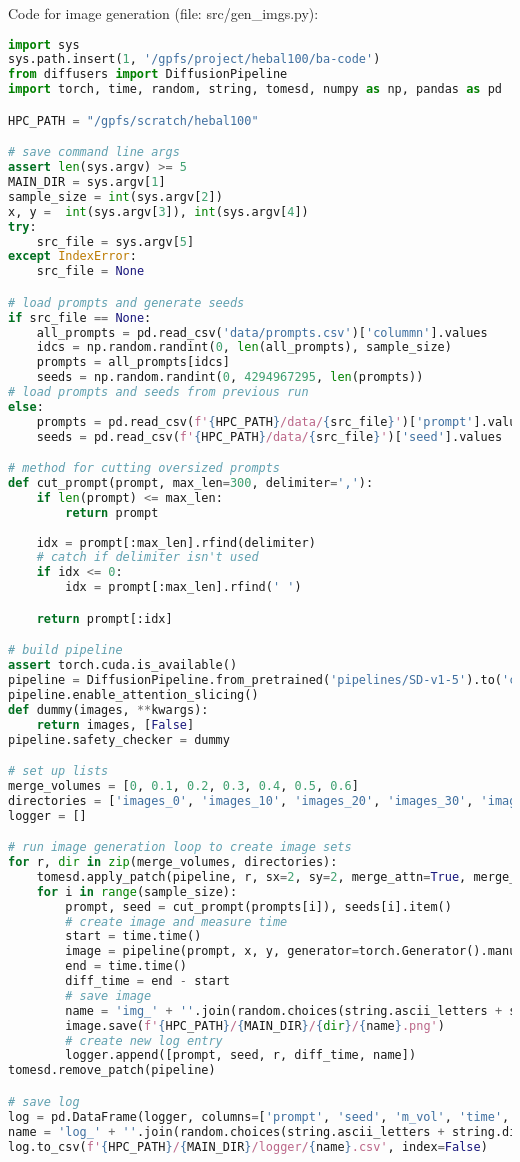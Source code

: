 Code for image generation (file: src/gen\_imgs.py):
\begin{lstlisting}[language=Python]
import sys       
sys.path.insert(1, '/gpfs/project/hebal100/ba-code')
from diffusers import DiffusionPipeline
import torch, time, random, string, tomesd, numpy as np, pandas as pd

HPC_PATH = "/gpfs/scratch/hebal100"

# save command line args
assert len(sys.argv) >= 5
MAIN_DIR = sys.argv[1]                      
sample_size = int(sys.argv[2])            
x, y =  int(sys.argv[3]), int(sys.argv[4]) 
try:
    src_file = sys.argv[5]                
except IndexError:
    src_file = None          

# load prompts and generate seeds
if src_file == None:
    all_prompts = pd.read_csv('data/prompts.csv')['colummn'].values
    idcs = np.random.randint(0, len(all_prompts), sample_size)
    prompts = all_prompts[idcs]
    seeds = np.random.randint(0, 4294967295, len(prompts))
# load prompts and seeds from previous run
else:
    prompts = pd.read_csv(f'{HPC_PATH}/data/{src_file}')['prompt'].values
    seeds = pd.read_csv(f'{HPC_PATH}/data/{src_file}')['seed'].values

# method for cutting oversized prompts
def cut_prompt(prompt, max_len=300, delimiter=','):
    if len(prompt) <= max_len:
        return prompt
    
    idx = prompt[:max_len].rfind(delimiter)
    # catch if delimiter isn't used
    if idx <= 0:
        idx = prompt[:max_len].rfind(' ')

    return prompt[:idx]

# build pipeline
assert torch.cuda.is_available()
pipeline = DiffusionPipeline.from_pretrained('pipelines/SD-v1-5').to('cuda')
pipeline.enable_attention_slicing()
def dummy(images, **kwargs):
    return images, [False]
pipeline.safety_checker = dummy

# set up lists
merge_volumes = [0, 0.1, 0.2, 0.3, 0.4, 0.5, 0.6]
directories = ['images_0', 'images_10', 'images_20', 'images_30', 'images_40', 'images_50', 'images_60']
logger = []

# run image generation loop to create image sets
for r, dir in zip(merge_volumes, directories):
    tomesd.apply_patch(pipeline, r, sx=2, sy=2, merge_attn=True, merge_crossattn=False, merge_mlp=False)
    for i in range(sample_size):
        prompt, seed = cut_prompt(prompts[i]), seeds[i].item()
        # create image and measure time
        start = time.time()
        image = pipeline(prompt, x, y, generator=torch.Generator().manual_seed(seed), ).images[0]
        end = time.time()
        diff_time = end - start
        # save image
        name = 'img_' + ''.join(random.choices(string.ascii_letters + string.digits, k=10))
        image.save(f'{HPC_PATH}/{MAIN_DIR}/{dir}/{name}.png')
        # create new log entry
        logger.append([prompt, seed, r, diff_time, name])       
tomesd.remove_patch(pipeline)

# save log
log = pd.DataFrame(logger, columns=['prompt', 'seed', 'm_vol', 'time', 'name'])
name = 'log_' + ''.join(random.choices(string.ascii_letters + string.digits, k=5))
log.to_csv(f'{HPC_PATH}/{MAIN_DIR}/logger/{name}.csv', index=False)
\end{lstlisting}
